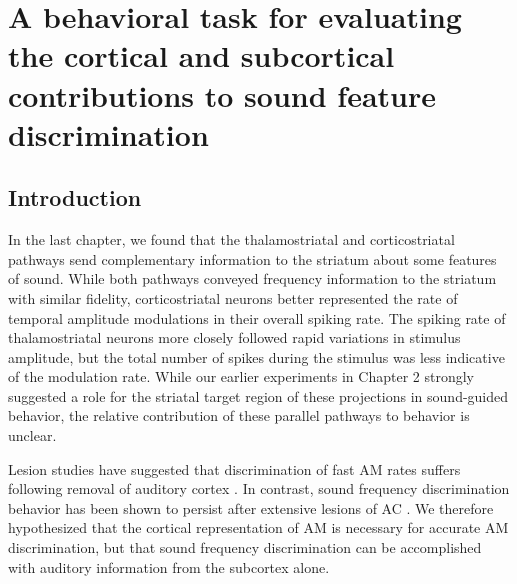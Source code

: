
\newcommand{\Task}{1} \newcommand{\TaskDiagram}{\Task A}
\newcommand{\TaskTrials}{\Task B} \newcommand{\TaskSounds}{\Task C}

\newcommand{\Training}{2} \newcommand{\TrainingSessions}{\Training A}
\newcommand{\TrainingTrials}{\Training B}

\newcommand{\amod}{3} \newcommand{\amodPsychometrics}{\Amod A, B, D, E}
\newcommand{\amodCorrect}{\Amod C, F}

\newcommand{\SingleSound}{4} \newcommand{\SinglePsy}{\SingleSound A, C}
\newcommand{\SingleSum}{\SingleSound B, D}
\newcommand{\SingleFreqP}{\SingleSound A}
\newcommand{\SingleFreqS}{\SingleSound B} \newcommand{\SingleAMP}{\SingleSound
C} \newcommand{\SingleAMS}{\SingleSound D}

\chapter{A behavioral task for evaluating the cortical and subcortical
contributions to sound feature discrimination}

\section{Introduction}
In the last chapter, we found that the thalamostriatal and corticostriatal
pathways send complementary information to the striatum about some features of
sound. 
%
While both pathways conveyed frequency information to the striatum with similar
fidelity, corticostriatal neurons better represented the rate of temporal
amplitude modulations in their overall spiking rate.
%
The spiking rate of thalamostriatal neurons more closely followed rapid
variations in stimulus amplitude, but the total number of spikes during the
stimulus was less indicative of the modulation rate.
While our earlier experiments in Chapter 2 strongly suggested a role for the
striatal target region of these projections in sound-guided behavior, the
relative contribution of these parallel pathways to behavior is unclear. 
%

Lesion studies have suggested that discrimination of fast AM rates suffers
following removal of auditory cortex \citep{Deutscher2006}.
%
In contrast, sound frequency discrimination behavior has been shown to persist
after extensive lesions of AC \citep{Gimenez2015}.
%
We therefore hypothesized that the cortical representation of AM is necessary
for accurate AM discrimination, but that sound frequency discrimination can be
accomplished with auditory information from the subcortex alone. 

